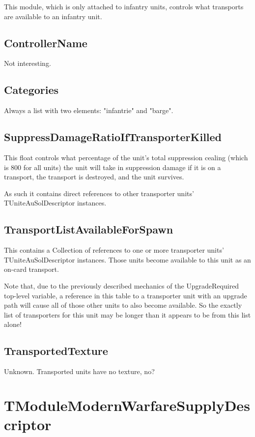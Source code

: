 \documentclass{article}
\begin{document}
This module, which is only attached to infantry units, controls what transports are available to an infantry unit.

\subsection{ControllerName}

Not interesting.

\subsection{Categories}

Always a list with two elements: "infantrie" and "barge".

\subsection{SuppressDamageRatioIfTransporterKilled}

This float controls what percentage of the unit's total suppression cealing (which is 800 for all units) the unit will take in suppression damage if it is on a transport, the transport is destroyed, and the unit survives.

As such it contains direct references to other transporter units' TUniteAuSolDescriptor instances.

\subsection{TransportListAvailableForSpawn}

This contains a Collection of references to one or more transporter units' TUniteAuSolDescriptor instances. Those units become available to this unit as an on-card transport.

Note that, due to the previously described mechanics of the UpgradeRequired top-level variable, a reference in this table to a transporter unit with an upgrade path will cause all of those other units to also become available. So the exactly list of transporters for this unit may be longer than it appears to be from this list alone!

\subsection{TransportedTexture}

Unknown. Transported units have no texture, no?

\section{TModuleModernWarfareSupplyDescriptor}
\end{document}
